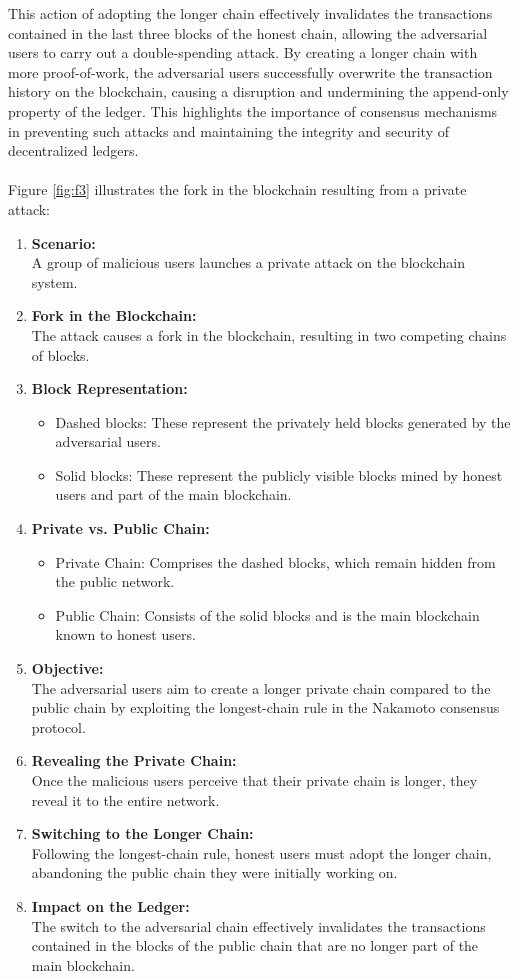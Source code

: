 \documentclass{report}
\begin{document}
This action of adopting the longer chain effectively invalidates the transactions contained in the last three blocks of the honest chain, allowing the adversarial users to carry out a double-spending attack. By creating a longer chain with more proof-of-work, the adversarial users successfully overwrite the transaction history on the blockchain, causing a disruption and undermining the append-only property of the ledger. This highlights the importance of consensus mechanisms in preventing such attacks and maintaining the integrity and security of decentralized ledgers.\\\\
Figure \ref{fig:f3} illustrates the fork in the blockchain resulting from a private attack:
\begin{enumerate}
	\item \textbf{Scenario:} \\A group of malicious users launches a private attack on the blockchain system.
	\item \textbf{Fork in the Blockchain:} \\The attack causes a fork in the blockchain, resulting in two competing chains of blocks.
	\item \textbf{Block Representation:} 
	\begin{itemize}
		\item Dashed blocks: These represent the privately held blocks generated by the adversarial users.
		\item Solid blocks: These represent the publicly visible blocks mined by honest users and part of the main blockchain.
	\end{itemize}
	\item \textbf{Private vs. Public Chain:}
	 \begin{itemize}
	 	\item Private Chain: Comprises the dashed blocks, which remain hidden from the public network.
	 	\item Public Chain: Consists of the solid blocks and is the main blockchain known to honest users.
	 \end{itemize}
 	\item \textbf{Objective:} \\The adversarial users aim to create a longer private chain compared to the public chain by exploiting the longest-chain rule in the Nakamoto consensus protocol.
 	\item \textbf{Revealing the Private Chain:}\\Once the malicious users perceive that their private chain is longer, they reveal it to the entire network.
 	\item \textbf{Switching to the Longer Chain:} \\Following the longest-chain rule, honest users must adopt the longer chain, abandoning the public chain they were initially working on.
 	\item \textbf{Impact on the Ledger:}\\The switch to the adversarial chain effectively invalidates the transactions contained in the blocks of the public chain that are no longer part of the main blockchain.
\end{enumerate}
\end{document}
